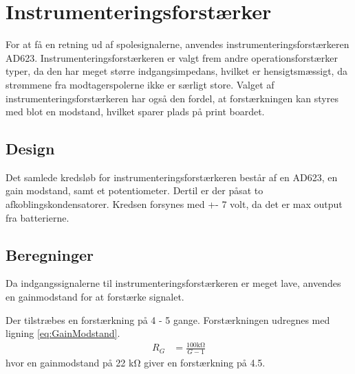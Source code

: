 \section{Instrumenteringsforstærker}\label{sec:summa}
For at få en retning ud af spolesignalerne, anvendes instrumenteringsforstærkeren AD623. Instrumenteringsforstærkeren er valgt frem andre operationsforstærker typer, da den har meget større indgangsimpedans, hvilket er hensigtsmæssigt, da strømmene fra modtagerspolerne ikke er særligt store. Valget af instrumenteringsforstærkeren har også den fordel, at forstærkningen kan styres med blot en modstand, hvilket sparer plads på print boardet.


\subsection{Design}
Det samlede kredsløb for instrumenteringsforstærkeren består af en AD623, en gain modstand, samt et potentiometer. Dertil er der påsat to afkoblingskondensatorer. Kredsen forsynes med +- 7 volt, da det er max output fra batterierne. 


\subsection{Beregninger}
Da indgangssignalerne til instrumenteringsforstærkeren er meget lave, anvendes en gainmodstand for at forstærke signalet.

Der tilstræbes en forstærkning på 4 - 5 gange. Forstærkningen udregnes med ligning \ref{eq:GainModstand}.
\begin{align}
	R_G & = \frac{100 \si{\kilo\ohm}}{G-1} \label{eq:GainModstand}
\end{align}
hvor en gainmodstand på 22 \si{\kilo\ohm} giver en forstærkning på 4.5.
